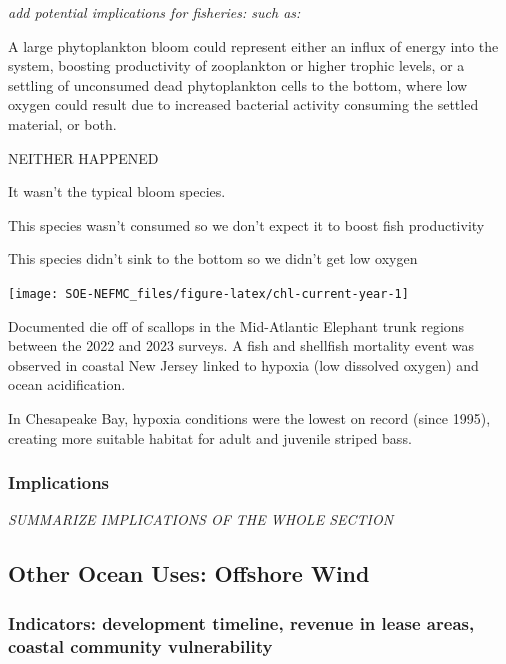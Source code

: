 \documentclass[
  10pt,
]{article}
\let\origfigure\figure
\let\endorigfigure\endfigure
\renewenvironment{figure}[1][2] {
    \expandafter\origfigure\expandafter[H]
} {
    \endorigfigure
}
\begin{document}
\emph{add potential implications for fisheries: such as:}

A large phytoplankton bloom could represent either an influx of energy into the system, boosting productivity of zooplankton or higher trophic levels, or a settling of unconsumed dead phytoplankton cells to the bottom, where low oxygen could result due to increased bacterial activity consuming the settled material, or both.

NEITHER HAPPENED

It wasn't the typical bloom species.

This species wasn't consumed so we don't expect it to boost fish productivity

This species didn't sink to the bottom so we didn't get low oxygen

\begin{figure}

{\centering \texttt{[image: SOE-NEFMC\_files/figure-latex/chl-current-year-1]} 

}

\end{figure}

Documented die off of scallops in the Mid-Atlantic Elephant trunk regions between the 2022 and 2023 surveys.
A fish and shellfish mortality event was observed in coastal New Jersey linked to hypoxia (low dissolved oxygen) and ocean acidification.

In Chesapeake Bay, hypoxia conditions were the lowest on record (since 1995), creating more suitable habitat for adult and juvenile striped bass.

\hypertarget{implications-6}{%
\subsubsection{Implications}\label{implications-6}}

\emph{SUMMARIZE IMPLICATIONS OF THE WHOLE SECTION}

\hypertarget{other-ocean-uses-offshore-wind}{%
\subsection{Other Ocean Uses: Offshore Wind}\label{other-ocean-uses-offshore-wind}}

\hypertarget{indicators-development-timeline-revenue-in-lease-areas-coastal-community-vulnerability}{%
\subsubsection{Indicators: development timeline, revenue in lease areas, coastal community vulnerability}\label{indicators-development-timeline-revenue-in-lease-areas-coastal-community-vulnerability}}
\end{document}
